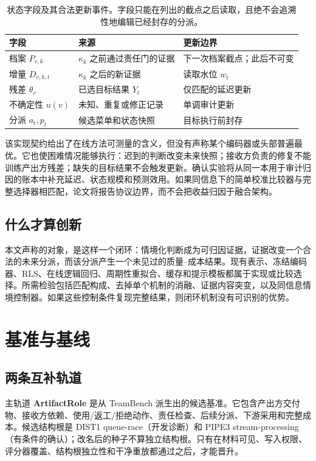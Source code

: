 \documentclass[UTF8,twocolumn]{ctexart}
\begin{document}
\begin{table}[t]
\centering\scriptsize
\setlength{\tabcolsep}{2pt}
\caption{状态字段及其合法更新事件。字段只能在列出的截点之后读取，且绝不会追溯性地编辑已经封存的分派。}
\label{tab:state-contract}
\begin{tabular}{p{}p{}p{}}
\toprule
字段 & 来源 & 更新边界 \\
\midrule
档案 $P_{v,k}$ & $\kappa_k$ 之前通过责任门的证据 & 下一次档案截点；此后不可变 \\
增量 $D_{v,k,t}$ & $\kappa_k$ 之后的新证据 & 读取水位 $w_t$ \\
残差 $\theta_v$ & 已选目标结果 $Y_t$ & 仅匹配的延迟更新 \\
不确定性 $u(v)$ & 未知、重复或修正记录 & 单调审计更新 \\
分派 $a_t,p_t$ & 候选菜单和状态快照 & 目标执行前封存 \\
\bottomrule
\end{tabular}
\end{table}

该实现契约给出了在线方法可测量的含义，但没有声称某个编码器或头部普遍最优。它也使困难情况能够执行：迟到的判断改变未来快照；接收方负责的修复不能训练产出方残差；缺失的目标结果不会触发更新。确认实验将从同一本用于审计归因的账本中补充延迟、状态规模和预测效用。如果同信息下的简单校准比较器与完整选择器相匹配，论文将报告协议边界，而不会把收益归因于融合架构。

\subsection{什么才算创新}
本文声称的对象，是这样一个闭环：情境化判断成为可归因证据，证据改变一个合法的未来分派，而该分派产生一个未见过的质量--成本结果。现有表示、冻结编码器、RLS、在线逻辑回归、周期性重拟合、缓存和提示模板都属于实现或比较选择。所需检验包括匹配构成、去掉单个机制的消融、证据内容突变，以及同信息情境控制器。如果这些控制条件复现完整结果，则闭环机制没有可识别的优势。

\section{基准与基线}
\label{sec:benchmark}

\subsection{两条互补轨道}
主轨道 \textbf{ArtifactRole} 是从 TeamBench 派生出的候选基准。它包含产出方交付物、接收方依赖、使用/返工/拒绝动作、责任检查、后续分派、下游采用和完整成本。候选结构根是 DIST1 queue-race（开发诊断）和 PIPE3 stream-processing（有条件的确认）；改名后的种子不算独立结构根。只有在材料可见、写入权限、评分器覆盖、结构根独立性和干净重放都通过之后，才能晋升。
\end{document}
